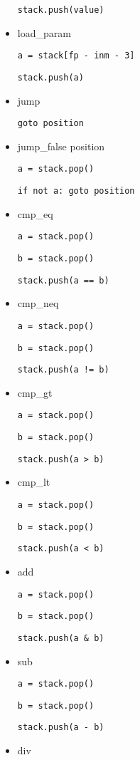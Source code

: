 \begin{itemize}
  \texttt{stack.push(value)}

\item load_param

  \texttt{a = stack[fp - inm - 3]}

  \texttt{stack.push(a)}

\item jump

  \texttt{goto position}

\item jump_false position

  \texttt{a = stack.pop()}

  \texttt{if not a: goto position}

\item cmp_eq

  \texttt{a = stack.pop()}

  \texttt{b = stack.pop()}

  \texttt{stack.push(a == b)}

\item cmp_neq

  \texttt{a = stack.pop()}

  \texttt{b = stack.pop()}

  \texttt{stack.push(a != b)}

\item cmp_gt

  \texttt{a = stack.pop()}

  \texttt{b = stack.pop()}

  \texttt{stack.push(a > b)}

\item cmp_lt

  \texttt{a = stack.pop()}

  \texttt{b = stack.pop()}

  \texttt{stack.push(a < b)}

\item add

  \texttt{a = stack.pop()}

  \texttt{b = stack.pop()}

  \texttt{stack.push(a & b)}

\item sub

  \texttt{a = stack.pop()}

  \texttt{b = stack.pop()}

  \texttt{stack.push(a - b)}

\item div
  

\end{itemize}
